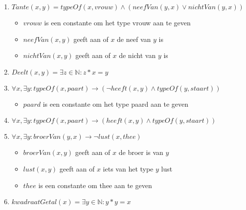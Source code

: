 \documentclass[]{article}
\begin{document}
\begin{enumerate}[a]
\begin{enumerate}[i]
      \item $ Tante(x,y) = typeOf(x,vrouw) \land (neefVan(y,x) \lor nichtVan(y,x)) $
      \begin{itemize}
        \item $vrouw$ is een constante om het type vrouw aan te geven
        \item $neefVan(x,y)$ geeft aan of $x$ de neef van $y$ is
        \item $nichtVan(x,y)$ geeft aan of $x$ de nicht van $y$ is
      \end{itemize}
      \item $Deelt(x,y) = \exists z \in \mathbb{N}: z * x = y$
      \item $ \forall x, \exists y: typeOf(x,paart) \longrightarrow (\neg heeft(x,y) \land typeOf(y,staart)) $
      \begin{itemize}
        \item $paard$ is een constante om het type paard aan te geven
      \end{itemize}
      \item $ \forall x, \exists y: typeOf(x,paart) \longrightarrow (heeft(x,y) \land typeOf(y,staart)) $
      \item $ \forall x, \exists y: broerVan(y,x) \longrightarrow \neg lust(x,thee) $
      \begin{itemize}
        \item $broerVan(x,y)$ geeft aan of $x$ de broer is van $y$
        \item $lust(x,y)$ geeft aan of $x$ iets van het type $y$ lust
        \item $thee$ is een constante om thee aan te geven
      \end{itemize}
      \item $kwadraatGetal(x) = \exists y \in \mathbb{N}: y*y = x $
    \end{enumerate}


\end{enumerate}
\end{document}
